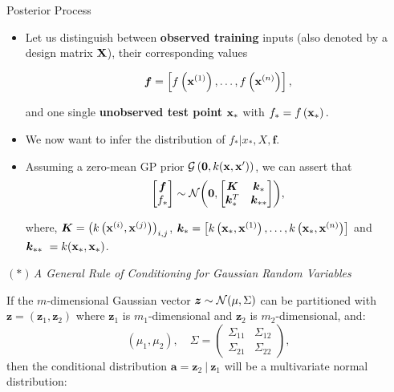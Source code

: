 \begin{frame}[c,allowframebreaks]{Posterior Process}

\begin{itemize}
\item Let us distinguish between \textbf{observed training} inputs (also denoted by a design matrix $\mathbf{X}$), their corresponding values
  
$$\bm{f} = \left[f\left(\mathbf{x}^{(1)}\right),\dots, f\left(\mathbf{x}^{(n)}\right)\right],$$ 

and one single \textbf{unobserved test point} $\mathbf{x}_*$ with $f_* = f\left(\mathbf{x}_*\right).$

\item We now want to infer the distribution of $f_* | x_*, X, \bm{f}$.

\item Assuming a zero-mean GP prior $\mathcal{G}\left(\bm{0}, k(\mathbf{x}, \mathbf{x}^\prime)\right)$, we can assert that
$$\begin{bmatrix}\bm{f} \\
f_*\end{bmatrix}\sim  
\mathcal{N}\biggl(\bm{0}, \begin{bmatrix} \bm{K} & \bm{k}_* \\ \bm{k}_*^T & \bm{k}_{**}\end{bmatrix}\biggr),$$

where, $\bm{K} = \left(k\left(\mathbf{x}^{(i)}, \mathbf{x}^{(j)}\right)\right)_{i,j}$, $\bm{k}_* = \left[k\left(\mathbf{x}_*, \mathbf{x}^{(1)}\right),\dots, k\left(\mathbf{x}_*, \mathbf{x}^{(n)}\right)\right]$ and $ \bm{k}_{**}\ = k(\x_*, \x_*)$.

\end{itemize}
\framebreak


\textit{${(*)}\,$A General Rule of Conditioning for Gaussian Random Variables}

\lz
\lz

If the $m$-dimensional Gaussian vector $\bm{z} \sim \mathcal{N}(\mu, \Sigma)$ can be partitioned with $\bm{z} = \left(\bm{z}_1, \bm{z}_2\right)$ where $\bm{z}_1$ is $m_1$-dimensional and $\bm{z}_2$ is $m_2$-dimensional, and:
$$\left(\mu_1, \mu_2\right), \quad \Sigma = \begin{pmatrix} \Sigma_{11} & \Sigma_{12} \\ \Sigma_{21} & \Sigma_{22} \end{pmatrix},$$
then the conditional distribution $\bm{a}= \bm{z}_2 ~|~ \bm{z}_1$ will be a multivariate normal distribution:


\end{frame}
